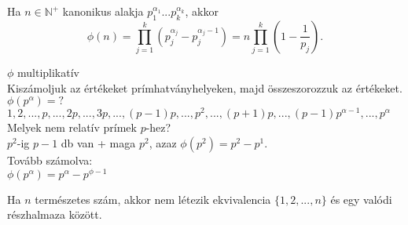 \begin{frame}

\begin{tcolorbox}[title={Tétel: ${\phi}$(n) kiszámolása}]
Ha $n \in \mathbb{N}^+$ kanonikus alakja $p_1^{{\alpha}_1}...p_k^{{\alpha}_k}$, akkor\\
$${\phi}(n) = \prod^k_{j=1} (p_j^{{\alpha}_j} - p_j^{{\alpha}_j - 1}) = n \prod^k_{j=1} (1 - \frac{1}{p_j}).$$
\end{tcolorbox}

\begin{tcolorbox}[title={Bizonyítás}]
$\phi$ multiplikatív\\
Kiszámoljuk az értékeket prímhatványhelyeken, majd összeszorozzuk az értékeket.\\
${\phi}(p^{\alpha}) = ?$\\
$1, 2, ..., p, ..., 2p, ..., 3p, ..., (p-1)p, ..., p^2, ..., (p+1)p, ..., (p-1)p^{{\alpha}-1}, ..., p^{\alpha}$\\
Melyek nem relatív prímek $p$-hez?\\
\smallskip
$p^2$-ig $p - 1$ db van + maga $p^2$, azaz ${\phi}(p^2) = p^2 - p^1$.\\
Tovább számolva:\\
${\phi}(p^{\alpha}) = p^{\alpha} - p^{\phi - 1}$

\end{tcolorbox}

\end{frame}

\begin{frame}[plain]
\end{frame}

\begin{frame}

\begin{tcolorbox}[title={Tétel: Véges halmaz valódi részhalmaza}]
Ha $n$ természetes szám, akkor nem létezik ekvivalencia $\{1, 2, ..., n\}$ és egy valódi részhalmaza között.

\end{tcolorbox}

\end{frame}

